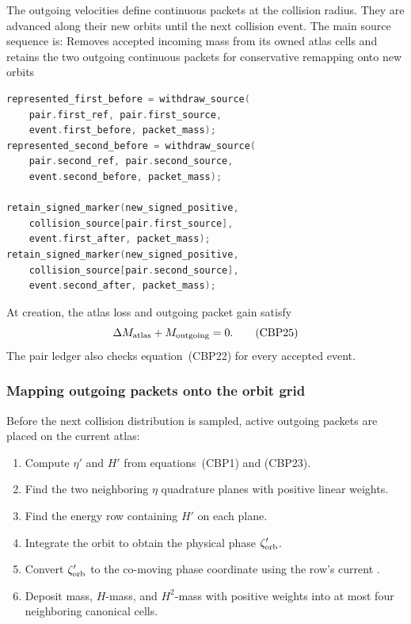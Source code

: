 The outgoing velocities define continuous packets at the collision radius.
They are advanced along their new orbits until the next collision event.  The
main source sequence is:
{}
{Removes accepted incoming mass from its owned atlas cells and retains the
 two outgoing continuous packets for conservative remapping onto new orbits}
\begin{lstlisting}[language=C++]
represented_first_before = withdraw_source(
    pair.first_ref, pair.first_source,
    event.first_before, packet_mass);
represented_second_before = withdraw_source(
    pair.second_ref, pair.second_source,
    event.second_before, packet_mass);

retain_signed_marker(new_signed_positive,
    collision_source[pair.first_source],
    event.first_after, packet_mass);
retain_signed_marker(new_signed_positive,
    collision_source[pair.second_source],
    event.second_after, packet_mass);
\end{lstlisting}

At creation, the atlas loss and outgoing packet gain satisfy
\[
 \Delta M_{\rm atlas}+M_{\rm outgoing}=0.              \tag{CBP25}
\]
The pair ledger also checks equation~(CBP22) for every accepted event.

\subsubsection{Mapping outgoing packets onto the orbit grid}

Before the next collision distribution is sampled, active outgoing packets
are placed on the current atlas:
\begin{enumerate}
\item Compute \(\eta'\) and \(H'\) from equations~(CBP1) and (CBP23).
\item Find the two neighboring \(\eta\) quadrature planes with positive linear
      weights.
\item Find the energy row containing \(H'\) on each plane.
\item Integrate the orbit to obtain the physical phase
      \(\zeta_{\rm orb}'\).
\item Convert \(\zeta_{\rm orb}'\) to the co-moving phase coordinate using the row's
      current .
\item Deposit mass, \(H\)-mass, and \(H^2\)-mass with positive weights into at
      most four neighboring canonical cells.
\end{enumerate}


